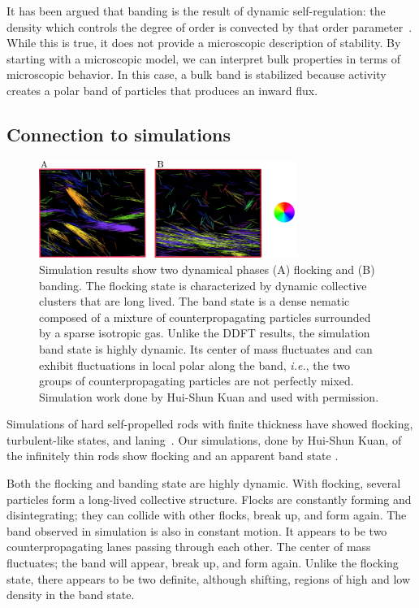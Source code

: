 It has been argued that banding is the result of dynamic self-regulation: the
density which controls the degree of order is convected by that order
parameter~\cite{baskaran_selfregulation_12, gopinath_dynamical_12}. While this
is true, it does not provide a microscopic description of stability. By starting
with a microscopic model, we can interpret bulk properties in terms of
microscopic behavior. In this case, a bulk band is stabilized because activity
creates a polar band of particles that produces an inward flux.

\subsection{Connection to simulations}
\begin{figure}[!b]
	\centering
  \includegraphics[width=0.75\textwidth]{figs/ch04_active/sim_flock_band_paper.png}
  \caption[Simulation snapshots]
  {Simulation results show two dynamical phases (A) flocking and (B)
    banding.  The flocking state is characterized by dynamic collective clusters
    that are long lived. The band state is a dense nematic composed of a 
    mixture of counterpropagating particles surrounded by a
    sparse isotropic gas. Unlike the DDFT results, the simulation band
    state is highly dynamic. Its center of mass fluctuates and can exhibit
    fluctuations in local polar along the band, \textit{i.e.}, the two
    groups of counterpropagating particles are not perfectly mixed.
    Simulation work done by Hui-Shun Kuan and used with
    permission.}\label{fig:sim_flock_band}
\end{figure}
Simulations of hard self-propelled rods with finite thickness have
showed flocking, turbulent-like states, and laning~\cite{wensink_emergent_12,
  kuan_hysteresis_15}. Our simulations, done by Hui-Shun Kuan, of
the infinitely thin rods show flocking  and an
apparent band state .

Both the flocking and banding state are highly dynamic. With flocking, several
particles form a long-lived collective structure. Flocks are constantly forming
and disintegrating; they can collide with other flocks, break up, and form
again.  The band observed in simulation is also in constant motion.  It appears
to be two counterpropagating lanes passing through each other. The center of
mass fluctuates; the band will appear, break up, and form again. Unlike the
flocking state, there appears to be two definite, although shifting, regions
of high and low density in the band state.

